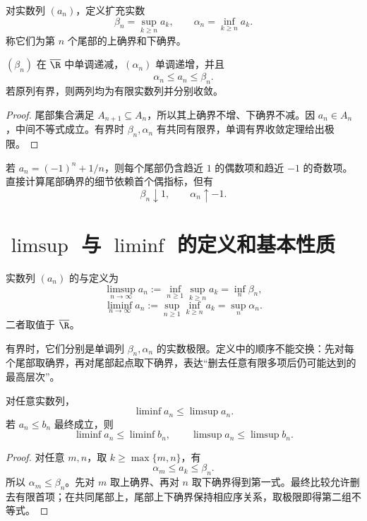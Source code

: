 对实数列 \((a_n)\)，定义扩充实数
\[
 \beta_n=\sup_{k\ge n}a_k,\qquad
 \alpha_n=\inf_{k\ge n}a_k.
\]
称它们为第 \(n\) 个尾部的上确界和下确界。

\begin{proposition}
\((\beta_n)\) 在 \(\overline{\R}\) 中单调递减，\((\alpha_n)\) 单调递增，并且
\[
 \alpha_n\le a_n\le\beta_n.
\]
若原列有界，则两列均为有限实数列并分别收敛。
\end{proposition}

\begin{proof}
尾部集合满足 \(A_{n+1}\subseteq A_n\)，所以其上确界不增、下确界不减。因 \(a_n\in A_n\)，中间不等式成立。有界时 \(\beta_n,\alpha_n\) 有共同有限界，单调有界收敛定理给出极限。
\end{proof}

\begin{example}
若 \(a_n=(-1)^n+1/n\)，则每个尾部仍含趋近 \(1\) 的偶数项和趋近 \(-1\) 的奇数项。直接计算尾部确界的细节依赖首个偶指标，但有
\[
 \beta_n\downarrow1,\qquad \alpha_n\uparrow-1.
\]
\end{example}

\section{\texorpdfstring{\(\limsup\)}{limsup} 与 \texorpdfstring{\(\liminf\)}{liminf} 的定义和基本性质}

\begin{definition}
实数列 \((a_n)\) 的与定义为
\[
 \limsup_{n\to\infty}a_n
 :=\inf_{n\ge1}\sup_{k\ge n}a_k
 =\inf_n\beta_n,
\]
\[
 \liminf_{n\to\infty}a_n
 :=\sup_{n\ge1}\inf_{k\ge n}a_k
 =\sup_n\alpha_n.
\]
二者取值于 \(\overline{\R}\)。
\end{definition}

有界时，它们分别是单调列 \(\beta_n,\alpha_n\) 的实数极限。定义中的顺序不能交换：先对每个尾部取确界，再对尾部起点取下确界，表达“删去任意有限多项后仍可能达到的最高层次”。

\begin{theorem}[基本序关系]
对任意实数列，
\[
 \liminf a_n\le\limsup a_n.
\]
若 \(a_n\le b_n\) 最终成立，则
\[
 \liminf a_n\le\liminf b_n,\qquad
 \limsup a_n\le\limsup b_n.
\]
\end{theorem}

\begin{proof}
对任意 \(m,n\)，取 \(k\ge\max\{m,n\}\)，有
\[
 \alpha_m\le a_k\le\beta_n.
\]
所以 \(\alpha_m\le\beta_n\)。先对 \(m\) 取上确界、再对 \(n\) 取下确界得到第一式。最终比较允许删去有限首项；在共同尾部上，尾部上下确界保持相应序关系，取极限即得第二组不等式。
\end{proof}

